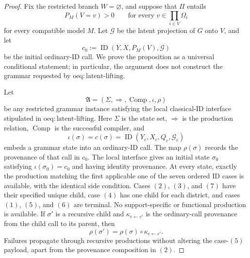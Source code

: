\documentclass{article}
\begin{document}
\begin{proof}
Fix the restricted branch \(W=\varnothing\), and suppose that \(\Pi\) entails
\[
 P_M(V=v)>0
 \qquad\text{for every }v\in\prod_{i\in V}\Omega_i
 \tag{1}
\]
for every compatible model \(M\).  Let \(\mathcal G\) be the latent projection of \(G\) onto \(V\), and let
\[
 c_0:=\operatorname{ID}(Y,X,P_M(V),\mathcal G)
\]
be the initial ordinary-ID call.  We prove the proposition as a universal conditional statement; in particular, the argument does not construct the grammar requested by \(\mathrm{oeq:latent\text{-}lifting}\).

Let
\[
 \mathfrak A=(\Sigma,\Rightarrow,\operatorname{Comp},\iota,\rho)
\]
be any restricted grammar instance satisfying the local classical-ID interface stipulated in \(\mathrm{oeq:latent\text{-}lifting}\).  Here \(\Sigma\) is the state set, \(\Rightarrow\) is the production relation, \(\operatorname{Comp}\) is the successful compiler, and
\[
 \iota(\sigma)=c(\sigma)
   =\operatorname{ID}(Y_c,X_c,Q_c,\mathcal G_c)
\]
embeds a grammar state into an ordinary-ID call.  The map \(\rho(\sigma)\) records the provenance of that call in \(c_0\).  The local interface gives an initial state \(\sigma_0\) satisfying \(\iota(\sigma_0)=c_0\) and having identity provenance.  At every state, exactly the production matching the first applicable one of the seven ordered ID cases is available, with the identical side condition.  Cases \((2)\), \((3)\), and \((7)\) have their specified unique child, case \((4)\) has one child for each district, and cases \((1)\), \((5)\), and \((6)\) are terminal.  No support-specific or functional production is available.  If \(\sigma'\) is a recursive child and \(\kappa_{c\leftarrow c'}\) is the ordinary-call provenance from the child call to its parent, then
\[
 \rho(\sigma')=\rho(\sigma)\circ\kappa_{c\leftarrow c'}.
 \tag{2}
\]
Failures propagate through recursive productions without altering the case-\((5)\) payload, apart from the provenance composition in \((2)\).


\end{proof}
\end{document}
